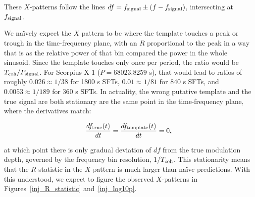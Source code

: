 These $X$-patterns follow the lines $df = f_{\textup{signal}} \pm (f - f_\textup{signal})$, intersecting at $f_\textup{signal}$.

We na\"{i}vely expect the $X$ pattern to be where the template touches a peak or trough in the time-frequency plane, with an $R$ proportional to the peak in a way that is as the relative power of that bin compared the power in the whole sinusoid. 
Since the template touches only once per period, the ratio would be $T_{\textup{coh}} / P_{\textup{signal}}$. For Scorpius X-1 ($P = 68023.8259$ s), that would lead to ratios of roughly $0.026 \approx 1/38$ for 1800 s SFTs, $0.01 \approx 1/81$ for 840 s SFTs, and $0.0053 \approx 1/189$ for 360 s SFTs.
In actuality, the wrong putative template and the true signal are both stationary are the same point in the time-frequency plane, where the derivatives match:

\begin{equation}
\frac{df_\textup{true} (t)}{dt} = \frac{df_\textup{template}(t)}{dt} = 0,
\end{equation}

\noindent at which point there is only gradual deviation of $df$ from the true modulation depth, governed by the frequency bin resolution, $1/T_\textup{coh}$. 
This stationarity means that the $R$-statistic in the $X$-pattern is much larger than na\"{i}ve predictions.
With this understood, we expect to figure the observed $X$-patterns in Figures~\ref{inj_R_statistic} and~\ref{inj_log10p}.


